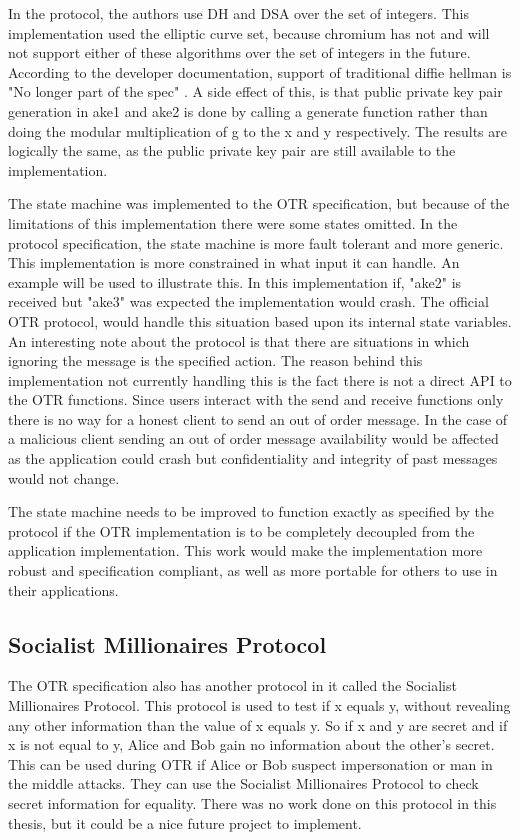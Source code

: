 In the protocol, the authors use DH and DSA over the set of integers. This implementation used the elliptic curve set, because chromium has not and will not support either of these algorithms over the set of integers in the future. According to the developer documentation, support of traditional diffie hellman is "No longer part of the spec" \cite{webcrypto-chromium}. A side effect of this, is that public private key pair generation in ake1 and ake2 is done by calling a generate function rather than doing the modular multiplication of g to the x and y respectively. The results are logically the same, as the public private key pair are still available to the implementation.  


The state machine was implemented to the OTR specification, but because of the limitations of this implementation there were some states omitted. In the protocol specification, the state machine is more fault tolerant and more generic. This implementation is more constrained in what input it can handle. An example will be used to illustrate this. In this implementation if, "ake2" is received but "ake3" was expected the implementation would crash. The official OTR protocol, would handle this situation based upon its internal state variables. An interesting note about the protocol is that there are situations in which ignoring the message is the specified action. The reason behind this implementation not currently handling this is the fact there is not a direct API to the OTR functions. Since users interact with the send and receive functions only there is no way for a honest client to send an out of order message. In the case of a malicious client sending an out of order message availability would be affected as the application could crash but confidentiality and integrity of past messages would not change. 


The state machine needs to be improved to function exactly as specified by the protocol if the OTR implementation is to be completely decoupled from the application implementation. This work would make the implementation more robust and specification compliant, as well as more portable for others to use in their applications.


\subsection{Socialist Millionaires Protocol}


The OTR specification also has another protocol in it called the Socialist Millionaires Protocol. This protocol is used to test if x equals y, without revealing any other information than the value of x equals y. So if x and y are secret and if x is not equal to y, Alice and Bob gain no information about the other's secret. This can be used during OTR if Alice or Bob suspect impersonation or man in the middle attacks. They can use the Socialist Millionaires Protocol to check secret information for equality. There was no work done on this protocol in this thesis, but it could be a nice future project to implement.


